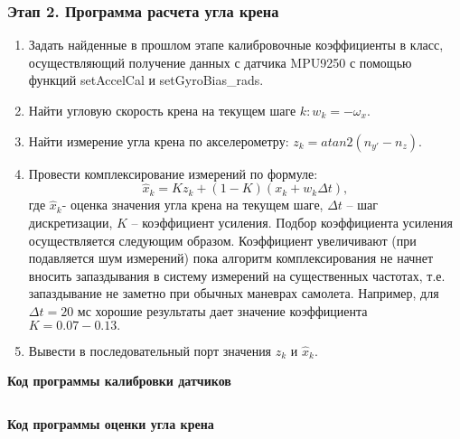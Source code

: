\subsubsection*{Этап 2. Программа расчета угла крена}

\begin{enumerate}

    \item Задать найденные в прошлом этапе калибровочные коэффициенты в класс, осуществляющий получение данных с датчика MPU9250 с помощью функций setAccelCal и setGyroBias\_rads.
    \item Найти угловую скорость крена на текущем шаге $k: w_k=-\omega_x$.
    \item Найти измерение угла крена по акселерометру: $z_k=atan2(n_{y'}-n_z)$.
    \item Провести комплексирование измерений по формуле:
        $$\hat x_k=Kz_k+(1-K)(x_k+w_k \Delta t),$$
        где $\hat x_k$- оценка значения угла крена на текущем шаге, $\Delta t$ – шаг дискретизации, $K$ – коэффициент усиления. Подбор коэффициента усиления осуществляется следующим образом. Коэффициент увеличивают (при подавляется шум измерений) пока алгоритм комплексирования не начнет вносить запаздывания в систему измерений на существенных частотах, т.е. запаздывание не заметно при обычных маневрах самолета. Например, для $\Delta t=20$ мс хорошие результаты дает значение коэффициента $K=0.07-0.13.$
    \item Вывести в последовательный порт значения $z_k$ и $\hat x_k$.
\end{enumerate}

\textbf{Код программы калибровки датчиков}

\inputminted[fontsize=\footnotesize, linenos]{cpp}{final/command_tour/bas/task_02/source_1.cpp}

\textbf{Код программы оценки угла крена}

\inputminted[fontsize=\footnotesize, linenos]{cpp}{final/command_tour/bas/task_02/source_2.cpp}